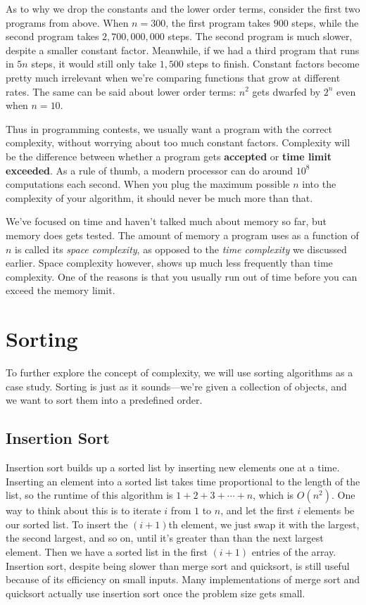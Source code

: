 As to why we drop the constants and the lower order terms, consider the first two programs from above. When $n=300$, the first program takes $900$ steps, while the second program takes $2,700,000,000$ steps. The second program is much slower, despite a smaller constant factor. Meanwhile, if we had a third program that runs in $5n$ steps, it would still only take $1,500$ steps to finish. Constant factors become pretty much irrelevant when we're comparing functions that grow at different rates. The same can be said about lower order terms: $n^2$ gets dwarfed by $2^n$ even when $n=10$.

Thus in programming contests, we usually want a program with the correct complexity, without worrying about too much constant factors. Complexity will be the difference between whether a program gets \textbf{\color{green}accepted} or \textbf{\color{red}time limit exceeded}. As a rule of thumb, a modern processor can do around $10^8$ computations each second. When you plug the maximum possible $n$ into the complexity of your algorithm, it should never be much more than that.

We've focused on time and haven't talked much about memory so far, but memory does gets tested. The amount of memory a program uses as a function of $n$ is called its \emph{space complexity}, as opposed to the \emph{time complexity} we discussed earlier. Space complexity however, shows up much less frequently than time complexity. One of the reasons is that you usually run out of time before you can exceed the memory limit.

\section{Sorting}

To further explore the concept of complexity, we will use sorting algorithms as a case study. Sorting is just as it sounds---we're given a collection of objects, and we want to sort them into a predefined order.

\subsection{Insertion Sort}

Insertion sort builds up a sorted list by inserting new elements one at a time. Inserting an element into a sorted list takes time proportional to the length of the list, so the runtime of this algorithm is $1 + 2 + 3 + \cdots + n$, which is $O(n^2)$. One way to think about this is to iterate $i$ from $1$ to $n$, and let the first $i$ elements be our sorted list. To insert the $(i+1)$th element, we just swap it with the largest, the second largest, and so on, until it's greater than than the next largest element. Then we have a sorted list in the first $(i+1)$ entries of the array. Insertion sort, despite being slower than merge sort and quicksort, is still useful because of its efficiency on small inputs. Many implementations of merge sort and quicksort actually use insertion sort once the problem size gets small.

